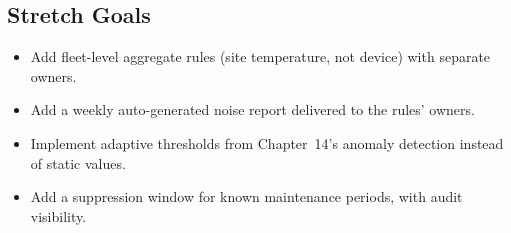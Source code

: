 \subsection*{Stretch Goals}
\begin{itemize}
    \item Add fleet-level aggregate rules (site temperature, not device) with separate owners.
    \item Add a weekly auto-generated noise report delivered to the rules' owners.
    \item Implement adaptive thresholds from Chapter~14's anomaly detection instead of static values.
    \item Add a suppression window for known maintenance periods, with audit visibility.
\end{itemize}
